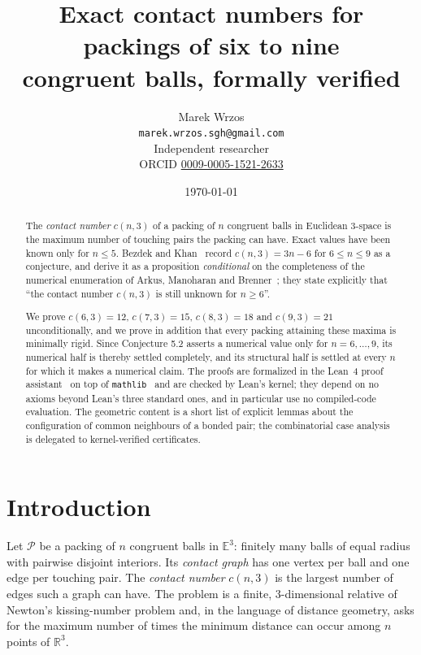 \documentclass[11pt,a4paper]{article}
\title{Exact contact numbers for packings of six to nine\\
       congruent balls, formally verified}
\author{Marek Wrzos\\[2pt]
  \normalsize\texttt{marek.wrzos.sgh@gmail.com}\\[1pt]
  \normalsize Independent researcher\\[1pt]
  \normalsize ORCID \href{https://orcid.org/0009-0005-1521-2633}{0009-0005-1521-2633}}
\date{\today}
\theoremstyle{plain}
\theoremstyle{definition}
\newcommand{\R}{\mathbb{R}}
\newcommand{\E}{\mathbb{E}}
\begin{document}
\maketitle

\begin{abstract}
The \emph{contact number} $c(n,3)$ of a packing of $n$ congruent balls in Euclidean
$3$-space is the maximum number of touching pairs the packing can have. Exact values
have been known only for $n \le 5$. Bezdek and Khan~\cite{BezdekKhan2018} record
$c(n,3) = 3n-6$ for $6 \le n \le 9$ as a conjecture, and derive it as a proposition
\emph{conditional} on the completeness of the numerical enumeration of
Arkus, Manoharan and Brenner~\cite{ArkusSIAM2011}; they state explicitly that
``the contact number $c(n,3)$ is still unknown for $n \ge 6$''.

We prove $c(6,3) = 12$, $c(7,3) = 15$, $c(8,3) = 18$ and $c(9,3) = 21$
unconditionally, and we prove in addition that every packing attaining these maxima is
minimally rigid. Since Conjecture 5.2 asserts a numerical value only for
$n = 6,\dots,9$, its numerical half is thereby settled completely, and its structural
half is settled at every $n$ for which it makes a numerical claim.
The proofs are formalized in the Lean~4 proof assistant~\cite{Lean4} on top of
\texttt{mathlib}~\cite{Mathlib2020} and are checked by Lean's kernel; they depend on
no axioms beyond Lean's three standard ones, and in particular use no compiled-code
evaluation. The geometric content is a short list of explicit lemmas about the
configuration of common neighbours of a bonded pair; the combinatorial case analysis
is delegated to kernel-verified certificates.
\end{abstract}

\section{Introduction}
\label{sec:intro}

Let $\mathcal{P}$ be a packing of $n$ congruent balls in $\E^3$: finitely many balls of
equal radius with pairwise disjoint interiors. Its \emph{contact graph} has one vertex
per ball and one edge per touching pair. The \emph{contact number} $c(n,3)$ is the
largest number of edges such a graph can have. The problem is a finite,
$3$-dimensional relative of Newton's kissing-number problem and, in the language of
distance geometry, asks for the maximum number of times the minimum distance can occur
among $n$ points of $\R^3$.
\end{document}
